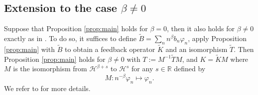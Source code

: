 \documentclass[11pt, dvipsnames]{amsart}
\begin{document}
\subsection{Extension to the case $\beta\neq 0$}
\label{app:beta}
Suppose that Proposition \ref{prop:main} holds for $\beta=0$, then it also holds for $\beta\neq0$ exactly as in \cite{Gagnon2022-fredholm}. To do so, it suffices to define $\tilde B= \sum_n n^{\beta} b_n \varphi_n$, apply Proposition \ref{prop:main} with $\tilde{B}$ to obtain a feedback operator $\tilde{K}$ and an isomorphism $\tilde{T}$. Then Proposition \ref{prop:main} holds for $\beta\neq 0$ with $T:= M^{-1} \tilde T M$, and $K = \tilde K M$ where $M$ is the isomorphism from $\mathcal{H}^{\beta+ s}$ to $\mathcal{H}^{s}$ for any $s\in\mathbb{R}$ defined by
\begin{equation}
    M : n^{-\beta} \varphi_n\mapsto \varphi_n.
\end{equation}
We refer to \cite{Gagnon2022-fredholm} for more details.
\end{document}
